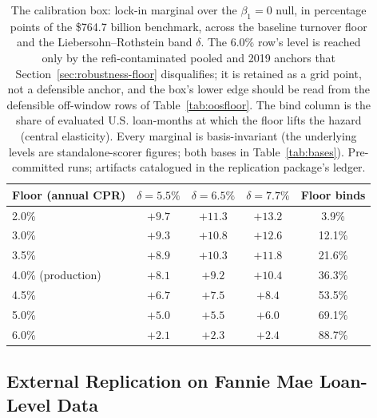 \begin{table}[!t]
\centering
\caption{The calibration box: lock-in marginal over the $\beta_1 = 0$ null, in percentage points of the \$764.7 billion benchmark, across the baseline turnover floor and the Liebersohn--Rothstein band $\delta$. The 6.0\% row's level is reached only by the refi-contaminated pooled and 2019 anchors that Section~\ref{sec:robustness-floor} disqualifies; it is retained as a grid point, not a defensible anchor, and the box's lower edge should be read from the defensible off-window rows of Table~\ref{tab:oosfloor}. The bind column is the share of evaluated U.S. loan-months at which the floor lifts the hazard (central elasticity). Every marginal is basis-invariant (the underlying levels are standalone-scorer figures; both bases in Table~\ref{tab:bases}). Pre-committed runs; artifacts catalogued in the replication package's ledger.}
\label{tab:floorband}
\begin{tabular}{lcccc}
\toprule
Floor (annual CPR) & $\delta = 5.5\%$ & $\delta = 6.5\%$ & $\delta = 7.7\%$ & Floor binds \\
\midrule
2.0\% & $+9.7$ & $+11.3$ & $+13.2$ & 3.9\% \\
3.0\% & $+9.3$ & $+10.8$ & $+12.6$ & 12.1\% \\
3.5\% & $+8.9$ & $+10.3$ & $+11.8$ & 21.6\% \\
4.0\% (production) & $+8.1$ & $+9.2$ & $+10.4$ & 36.3\% \\
4.5\% & $+6.7$ & $+7.5$ & $+8.4$ & 53.5\% \\
5.0\% & $+5.0$ & $+5.5$ & $+6.0$ & 69.1\% \\
6.0\% & $+2.1$ & $+2.3$ & $+2.4$ & 88.7\% \\
\bottomrule
\end{tabular}
\end{table}

\subsection{External Replication on Fannie Mae Loan-Level Data}\label{sec:pathb-fannie}

